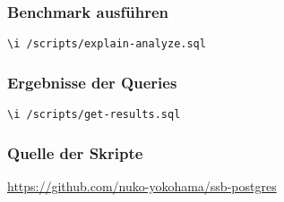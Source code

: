 \subsubsection{Benchmark ausführen}
\begin{lstlisting}[caption=Benchmark ausführen, label=code:runbenchmark]
\i /scripts/explain-analyze.sql
\end{lstlisting}

\subsubsection{Ergebnisse der Queries}
\begin{lstlisting}[caption=Ergebnisse der Queries abrufen, label=code:getresults]
\i /scripts/get-results.sql
\end{lstlisting}

\subsubsection{Quelle der Skripte}
\url{https://github.com/nuko-yokohama/ssb-postgres}~\cite{nukoyokohama_ssb-postgres_2023}
